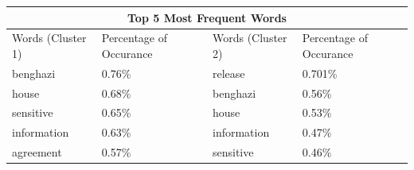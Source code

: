 \begin{center}
\begin{tabular}{ |p{3cm}|p{3cm}|| p{3cm}|p{3cm}|  }
 \hline
 \multicolumn{4}{|c|}{Top 5 Most Frequent Words} \\
 \hline
 Words (Cluster 1)  & Percentage of Occurance & Words (Cluster 2) & Percentage of Occurance\\
 \hline
 benghazi & 0.76\% & release  & 0.701\% \\
 house &  0.68\% & benghazi & 0.56\% \\
 sensitive & 0.65\% & house & 0.53\%\\
 information & 0.63\% & information & 0.47\%\\
 agreement & 0.57\% &  sensitive  & 0.46\% \\
 \hline
\end{tabular}
\end{center}
